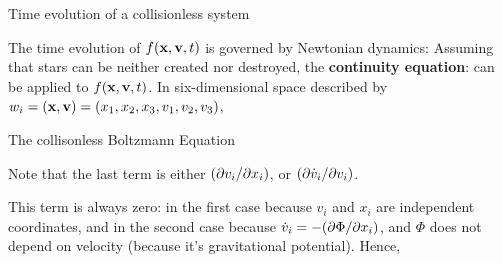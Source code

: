 \documentclass[letterpaper,landscape]{slides}
\begin{document}
\begin{slide}
\begin{center}
{\large \color{red} 
        Time evolution of a collisionless system }
\end{center}

The time evolution of $f({\bf x}, {\bf v}, t)$ is governed by Newtonian dynamics:
Assuming that stars can be neither created nor destroyed, the {\bf continuity
equation}:
can be applied to $f({\bf x}, {\bf v}, t)$. In six-dimensional space
described by $w_i=({\bf x}, {\bf v}) = (x_1, x_2, x_3, v_1, v_2, v_3)$, 


\vfill
\end{slide}



\begin{slide}
\begin{center}
{\large \color{red} 
                    The collisonless Boltzmann Equation      }
\end{center}


Note that the last term is either $(\partial v_i / \partial x_i)$, or $(\partial \dot v_i / \partial v_i)$. 

{\color{red} This term is always zero:} in the first case because $v_i$ and $x_i$ are independent coordinates, 
and in the second case because $\dot v_i = - (\partial \Phi / \partial x_i)$, and $\Phi$ does not depend 
on velocity (because it's gravitational potential). Hence, 



\vfill
\end{slide}
\end{document}
